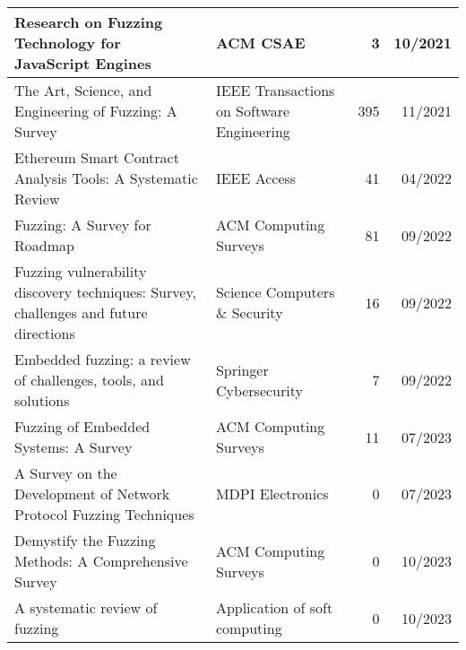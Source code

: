 \documentclass{article}
\begin{document}
\begin{longtable}{|P{0.44\textwidth}|P{0.32\textwidth}|r|r|}
    Research on Fuzzing Technology for JavaScript Engines\cite{JavaScript}                                                                        & ACM CSAE                                                   & 3              & 10/2021       \\\hline
    The Art, Science, and Engineering of Fuzzing: A Survey\cite{ArtScienceEngineeringFuzzing}                                                     & IEEE Transactions on Software Engineering                  & 395            & 11/2021       \\\hline
    Ethereum Smart Contract Analysis Tools: A Systematic Review\cite{Ethereum}                                                                    & IEEE Access                                                & 41             & 04/2022       \\\hline
    Fuzzing: A Survey for Roadmap\cite{FuzzingASurveyforRoadmap}                                                                                  & ACM Computing Surveys                                      & 81             & 09/2022       \\\hline
    Fuzzing vulnerability discovery techniques: Survey, challenges and future directions\cite{FuzzingVulnerabilityDiscoveryTechniques}            & Science Computers \& Security                              & 16             & 09/2022       \\\hline
    Embedded fuzzing: a review of challenges, tools, and solutions\cite{Embedded2}                                                                & Springer Cybersecurity                                     & 7              & 09/2022       \\\hline
    Fuzzing of Embedded Systems: A Survey\cite{Embedded}                                                                                          & ACM Computing Surveys                                      & 11             & 07/2023       \\\hline
    A Survey on the Development of Network Protocol Fuzzing Techniques\cite{Network2023}                                                          & MDPI Electronics                                           & 0              & 07/2023       \\\hline
    Demystify the Fuzzing Methods: A Comprehensive Survey\cite{Demystifying}                                                                      & ACM Computing Surveys                                      & 0              & 10/2023       \\\hline
    A systematic review of fuzzing\cite{SystematicReview2023}                                                                                     & Application of soft computing                              & 0              & 10/2023       \\\hline
\end{longtable}
\end{document}

